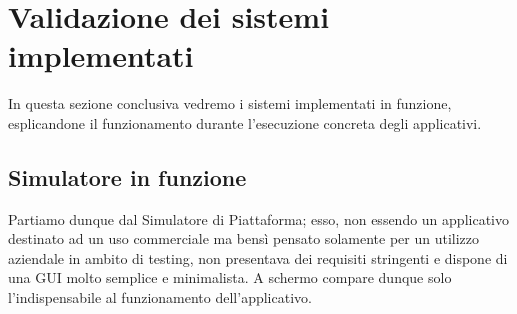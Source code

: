 \vspace{5mm}
\section{Validazione dei sistemi implementati}
In questa sezione conclusiva vedremo i sistemi implementati in funzione, esplicandone il funzionamento durante l'esecuzione concreta degli applicativi.\newline
\subsection{Simulatore in funzione}
Partiamo dunque dal Simulatore di Piattaforma; esso, non essendo un applicativo destinato ad un uso commerciale ma bensì pensato solamente per un utilizzo aziendale in ambito di testing, non presentava dei requisiti stringenti e dispone di una GUI molto semplice e minimalista.\newline
A schermo compare dunque solo l'indispensabile al funzionamento dell'applicativo.\newline

